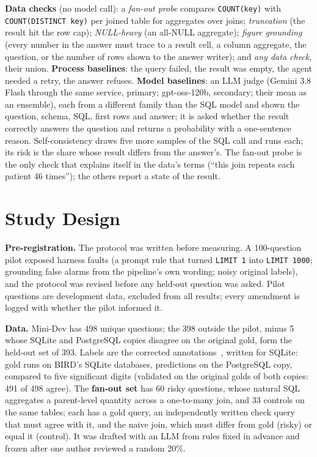 \documentclass[conference]{IEEEtran}
\begin{document}
\textbf{Data checks} (no model call): a \emph{fan-out probe} compares \texttt{COUNT(key)} with
\texttt{COUNT(DISTINCT key)} per joined table for aggregates over joins; \emph{truncation} (the result
hit the row cap); \emph{NULL-heavy} (an all-NULL aggregate); \emph{figure grounding} (every number in
the answer must trace to a result cell, a column aggregate, the question, or the number of rows shown
to the answer writer); and \emph{any data check}, their union. \textbf{Process baselines}: the query
failed, the result was empty, the agent needed a retry, the answer refuses. \textbf{Model baselines}:
an LLM judge (Gemini 3.8 Flash through the same service, primary; gpt-oss-120b, secondary; their mean as
an ensemble), each
from a different family than the SQL model and shown the question, schema, SQL, first rows and answer;
it is asked whether the result correctly answers the question and returns a probability with a
one-sentence reason. Self-consistency draws five more samples of the SQL call and runs each; its risk
is the share whose result differs from the answer's. The fan-out probe is the only check that explains
itself in the data's terms (``this join repeats each patient 46 times''); the others report a state of
the result.

\section{Study Design}

\textbf{Pre-registration.} The protocol was written before measuring. A 100-question pilot exposed
harness faults (a prompt rule that turned \texttt{LIMIT 1} into \texttt{LIMIT 1000}; grounding false
alarms from the pipeline's own wording; noisy original labels), and the protocol was revised before
any held-out question was asked. Pilot questions are development data, excluded from all results;
every amendment is logged with whether the pilot informed it.

\textbf{Data.} Mini-Dev has 498 unique questions; the 398 outside the pilot, minus 5 whose SQLite and
PostgreSQL copies disagree on the original gold, form the held-out set of 393. Labels are the
corrected annotations~\cite{jin2026annotation}, written for SQLite: gold runs on BIRD's SQLite
databases, predictions on the PostgreSQL copy, compared to five significant digits (validated on the
original golds of both copies: 491 of 498 agree). The \textbf{fan-out set} has 60 risky questions,
whose natural SQL aggregates a parent-level quantity across a one-to-many join, and 33 controls on the
same tables; each has a gold query, an independently written check query that must agree with it, and
the naive join, which must differ from gold (risky) or equal it (control). It was drafted with an LLM
from rules fixed in advance and frozen after one author reviewed a random 20\%.
\end{document}
